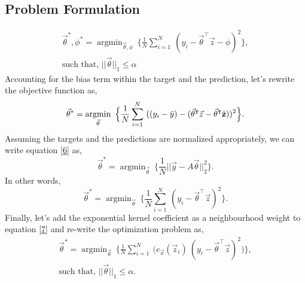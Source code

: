 \documentclass{article}
\DeclareMathOperator*{\argmin}{argmin}
\begin{document}
\subsection{Problem Formulation}
\begin{equation}\label{5}
    \begin{aligned}
        \vec{\theta}^{*}, \phi^{*} = \argmin_{\vec{\theta}, \phi}\ \Big\{\frac{1}{N} \sum_{i=1}^N\ (y_i - \vec{\theta}^\intercal \vec{z} - \phi)^2\Big\},\\
        \text{such that, } ||\vec{\theta}||_{1} \leq \alpha
    \end{aligned}
\end{equation}
Accounting for the bias term within the target and the prediction, let's rewrite the objective function as,
\begin{equation}\label{6}
    \vec{\theta}^{*} = \argmin_{\vec{\theta}}\ \Big\{\frac{1}{N} \sum_{i=1}^N\ ((y_i - \Bar{y}) - (\vec{\theta}^\intercal \vec{z} - \vec{\theta}^\intercal \Bar{\textbf{z}}))^2\Big\}.
\end{equation}
Assuming the targets and the predictions are normalized appropriately, we can write equation \eqref{6} as,
\begin{equation*}
    \vec{\theta}^{*} = \argmin_{\vec{\theta}}\ \Big\{\frac{1}{N} ||\vec{y} - A\vec{\theta}||_2^2\Big\}.
\end{equation*}
In other words,
\begin{equation}\label{7}
    \vec{\theta}^{*} = \argmin_{\vec{\theta}}\ \Big\{\frac{1}{N} \sum_{i=1}^N\ (y_i - \vec{\theta}^\intercal \vec{z})^2\Big\}.
\end{equation}
Finally, let's add the exponential kernel coefficient as a neighbourhood weight to equation \eqref{7} and re-write the optimization problem as,
\begin{equation}\label{8}
    \begin{aligned}
        \vec{\theta}^{*} = \argmin_{\vec{\theta}}\ \Big\{\frac{1}{N} \sum_{i=1}^N\ \Big(e_{\vec{x}}(\vec{z}_i)\ (y_i - \vec{\theta}^\intercal \vec{z})^2\Big)\Big\},\\
        \text{such that, } ||\vec{\theta}||_{1} \leq \alpha.
    \end{aligned}
\end{equation}
\end{document}
